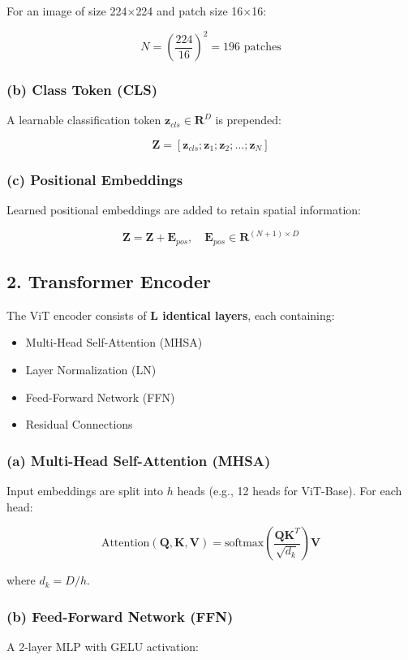 \documentclass[12pt]{article}
\begin{document}
\begin{appendices}
For an image of size 224$\times$224 and patch size 16$\times$16:

\[
N = \left( \frac{224}{16} \right)^2 = 196 \text{ patches}
\]

\subsubsection*{(b) Class Token (CLS)}
A learnable classification token $\mathbf{z}_{cls} \in \mathbf{R}^D$ is prepended:

\[
\mathbf{Z} = [\mathbf{z}_{cls}; \mathbf{z}_1; \mathbf{z}_2; \dots; \mathbf{z}_N]
\]

\subsubsection*{(c) Positional Embeddings}
Learned positional embeddings are added to retain spatial information:

\[
\mathbf{Z} = \mathbf{Z} + \mathbf{E}_{pos}, \quad \mathbf{E}_{pos} \in \mathbf{R}^{(N+1) \times D}
\]

\subsection*{2. Transformer Encoder}
The ViT encoder consists of \textbf{L identical layers}, each containing:

\begin{itemize}
    \item Multi-Head Self-Attention (MHSA)
    \item Layer Normalization (LN)
    \item Feed-Forward Network (FFN)
    \item Residual Connections
\end{itemize}

\subsubsection*{(a) Multi-Head Self-Attention (MHSA)}
Input embeddings are split into $h$ heads (e.g., 12 heads for ViT-Base). For each head:

\[
\text{Attention}(\mathbf{Q}, \mathbf{K}, \mathbf{V}) = \text{softmax}\left( \frac{\mathbf{Q} \mathbf{K}^T}{\sqrt{d_k}} \right) \mathbf{V}
\]

where $d_k = D / h$.

\subsubsection*{(b) Feed-Forward Network (FFN)}
A 2-layer MLP with GELU activation:


\end{appendices}
\end{document}
